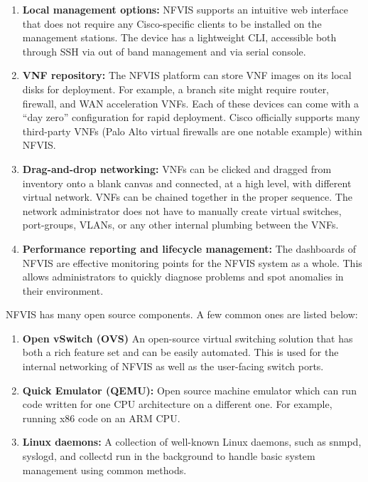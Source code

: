 \begin{enumerate}
  \item \textbf{Local management options:} NFVIS supports an intuitive web interface
  that does not require any Cisco-specific clients to be installed on the
  management stations. The device has a lightweight CLI, accessible both through
  SSH via out of band management and via serial console.
  \item \textbf{VNF repository:} The NFVIS platform can store VNF images on its
  local disks for deployment. For example, a branch site might require router,
  firewall, and WAN acceleration VNFs. Each of these devices can come with a
  ``day zero'' configuration for rapid deployment. Cisco officially supports
  many third-party VNFs (Palo Alto virtual firewalls are one notable example)
  within NFVIS.
  \item \textbf{Drag-and-drop networking:} VNFs can be clicked and dragged from
  inventory onto a blank canvas and connected, at a high level, with different
  virtual network. VNFs can be chained together in the proper sequence. The
  network administrator does not have to manually create virtual switches,
  port-groups, VLANs, or any other internal plumbing between the VNFs.
  \item \textbf{Performance reporting and lifecycle management:} The dashboards
  of NFVIS are effective monitoring points for the NFVIS system as a whole. This
  allows administrators to quickly diagnose problems and spot anomalies in their
  environment.
\end{enumerate}

NFVIS has many open source components. A few common ones are listed below:

\begin{enumerate}
  \item \textbf{Open vSwitch (OVS)} An open-source virtual switching solution that
  has both a rich feature set and can be easily automated. This is used for the
  internal networking of NFVIS as well as the user-facing switch ports.
  \item \textbf{Quick Emulator (QEMU):} Open source machine emulator which can run
  code written for one CPU architecture on a different one. For example, running x86
  code on an ARM CPU.
  \item \textbf{Linux daemons:} A collection of well-known Linux daemons, such as
  snmpd, syslogd, and collectd run in the background to handle basic system
  management using common methods.
\end{enumerate}

